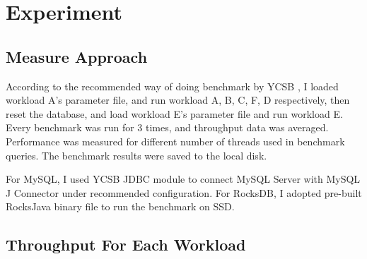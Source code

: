 \documentclass[journal]{IEEEtran}
\begin{document}
\section{Experiment}

\subsection{Measure Approach}

According to the recommended way of doing benchmark by YCSB \cite{ref2}, I loaded workload A's parameter file, and run workload A, B, C, F, D respectively, then reset the database, and load workload E's parameter file and run workload E. Every benchmark was run for 3 times, and throughput data was averaged. Performance was measured for different number of threads used in benchmark queries. The benchmark results were saved to the local disk.

For MySQL, I used YCSB JDBC module to connect MySQL Server with MySQL J Connector under recommended configuration\cite{ref3}. For RocksDB, I adopted pre-built RocksJava binary file to run the benchmark on SSD.

\subsection{Throughput For Each Workload}
\end{document}
